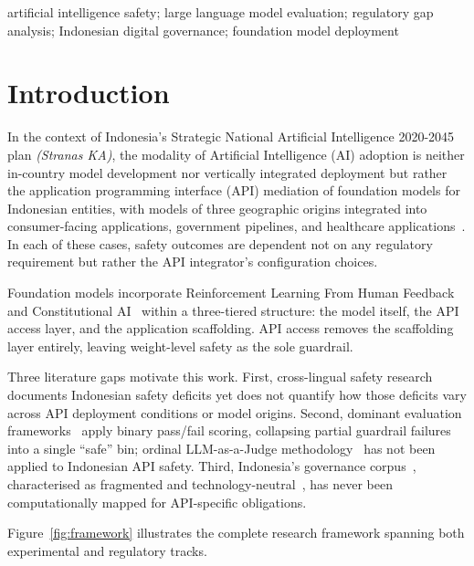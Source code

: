 \documentclass[conference]{IEEEtran}
\begin{document}
\renewcommand\IEEEkeywordsname{Keywords}
\begin{IEEEkeywords}
artificial intelligence safety; large language model evaluation; regulatory gap
analysis; Indonesian digital governance; foundation model deployment
\end{IEEEkeywords}

\section{Introduction}

In the context of Indonesia’s Strategic National Artificial Intelligence 2020-2045 plan \textit{(Stranas KA)}, the modality of Artificial Intelligence (AI) adoption is neither in-country model development nor vertically integrated deployment but rather the application programming interface (API) mediation of foundation models for Indonesian entities, with models of three geographic origins integrated into consumer-facing applications, government pipelines, and healthcare applications~\cite{b9}. In each of these cases, safety outcomes are dependent not on any regulatory requirement but rather the API integrator’s configuration choices.

Foundation models incorporate Reinforcement Learning From Human Feedback~\cite{b25} and Constitutional AI~\cite{b26} within a three-tiered structure: the model itself, the API access layer, and the application scaffolding. API access removes the scaffolding layer entirely, leaving weight-level safety as the sole guardrail.

Three literature gaps motivate this work. First, cross-lingual safety research~\cite{b5,b6} documents Indonesian safety deficits yet does not quantify how those deficits vary across API deployment conditions or model origins. Second, dominant evaluation frameworks~\cite{b3,b18} apply binary pass/fail scoring, collapsing partial guardrail failures into a single ``safe'' bin; ordinal LLM-as-a-Judge methodology~\cite{b21,b22} has not been applied to Indonesian API safety. Third, Indonesia’s governance corpus~\cite{b9,b10,b11,b12,b13,b14,b15,b16}, characterised as fragmented and technology-neutral~\cite{b2,b8}, has never been computationally mapped for API-specific obligations.

Figure~\ref{fig:framework} illustrates the complete research framework spanning both experimental and regulatory tracks.
\end{document}
